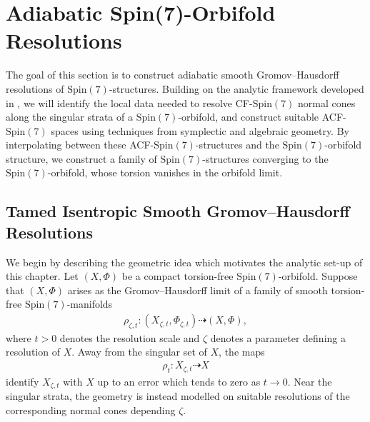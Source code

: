 \documentclass[psamsfonts]{amsart}
\theoremstyle{plain}
\theoremstyle{definition}{
\newtheorem{defi}{Definition}[section]
\newtheorem{ass}{Assumption}
\newtheorem*{nota}{Notation}}
\theoremstyle{remark}{
\newtheorem{rem}{Remark}
\newtheorem{ex}{Example}}
\theoremstyle{plain}{
\newtheorem{thm}{Theorem}[section]
\newtheorem{lem}{Lemma}[section]
\newtheorem{cor}{Corollary}[section]
\newtheorem{prop}{Proposition}[section]
\newtheorem{con}{Conjecture}[section]}
\newcommand{\m}[1]{{\mathrm{#1}}}
\begin{document}
\section{Adiabatic Spin(7)-Orbifold Resolutions}
\label{Adiabatic Spin(7)-Orbifold Resolutions}

The goal of this section is to construct adiabatic smooth Gromov--Hausdorff resolutions of $\m{Spin}(7)$-structures. Building on the analytic framework developed in \cite{majewskiDirac}, we will identify the local data needed to resolve CF-$\m{Spin}(7)$ normal cones along the singular strata of a $\m{Spin}(7)$-orbifold, and construct suitable ACF-$\m{Spin}(7)$ spaces using techniques from symplectic and algebraic geometry. By interpolating between these ACF-$\m{Spin}(7)$-structures and the $\m{Spin}(7)$-orbifold structure, we construct a family of $\m{Spin}(7)$-structures converging to the $\m{Spin}(7)$-orbifold, whose torsion vanishes in the orbifold limit.




\subsection{Tamed Isentropic Smooth Gromov--Hausdorff Resolutions}
\label{Tamed Isentropic Smooth Gromov--Hausdorff Resolutions}

We begin by describing the geometric idea which motivates the analytic set-up of this chapter. Let $(X,\Phi)$ be a compact torsion-free $\m{Spin}(7)$-orbifold. Suppose that $(X,\Phi)$ arises as the Gromov--Hausdorff limit of a family of smooth torsion-free $\m{Spin}(7)$-manifolds
\begin{align*}
        \rho_{\zeta,t}\colon (X_{\zeta,t},\Phi_{\zeta,t})
        \dashrightarrow
        (X,\Phi),
\end{align*}
where $t>0$ denotes the resolution scale and $\zeta$ denotes a parameter defining a resolution of $X$. Away from the singular set of $X$, the maps
\begin{align*}
        \rho_{t}\colon X_{\zeta,t}\dashrightarrow X
\end{align*}
identify $X_{\zeta,t}$ with $X$ up to an error which tends to zero as $t\to 0$. Near the singular strata, the geometry is instead modelled on suitable resolutions of the corresponding normal cones depending $\zeta$.\\
\end{document}
